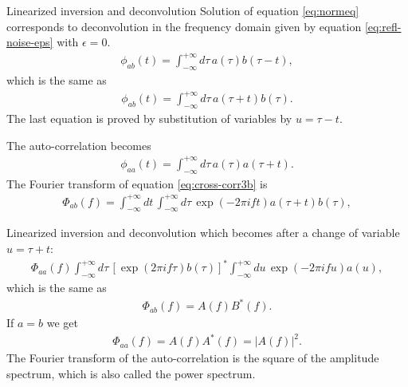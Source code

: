 \documentclass[xcolor=dvipsnames,notes]{beamer}
\begin{document}
\begin{frame}{Linearized inversion and deconvolution}
Solution of equation \eqref{eq:normeq} corresponds to
deconvolution in the frequency domain given by equation \eqref{eq:refl-noise-eps}
with $\epsilon=0$.
%
\begin{eqnarray}
  \phi_{a b}(t) =\int^{+\infty}_{-\infty} d\tau\, a(\tau)b(\tau-t),
             \label{eq:cross-corr3}
\end{eqnarray}
%
which is the same as
%
\begin{eqnarray}
  \phi_{a b}(t) =\int^{+\infty}_{-\infty} d\tau\, a(\tau+t)b(\tau).
             \label{eq:cross-corr3b}
\end{eqnarray}
%
The last equation is proved by substitution of variables by $u=\tau-t$.

The auto-correlation becomes
%
\begin{eqnarray}
  \phi_{a a}(t) =\int^{+\infty}_{-\infty}d\tau\, a(\tau)a(\tau+t).
             \label{eq:auto-corr3c}
\end{eqnarray}
%
The Fourier transform of equation \eqref{eq:cross-corr3b} is
%
\begin{eqnarray}
  \Phi_{ab}(f)=\int^{+\infty}_{-\infty}dt\, \int^{+\infty}_{-\infty}d\tau\, 
        \exp(-2\pi i f t)a(\tau+t)b(\tau),
\end{eqnarray}
%
\end{frame}
%
\begin{frame}{Linearized inversion and deconvolution}
which becomes after a change of variable $u=\tau+t$:
%
\begin{eqnarray}
  \Phi_{aa}(f)\int^{+\infty}_{-\infty}d\tau\, \left[\exp(2\pi i f \tau)b(\tau)\right]^*
   \int^{+\infty}_{-\infty}du\, \exp(-2\pi i f u) a(u),
\end{eqnarray}
%
which is the same as
%
\begin{eqnarray}
 \Phi_{ab}(f)=A(f)B^*(f). 
             \label{eq:cross-spectr}
\end{eqnarray}
%
If  $a=b$ we get 
%
\begin{eqnarray}
 \Phi_{aa}(f)=A(f)A^*(f) =|A(f)|^2.
             \label{eq:auto-spectr}
\end{eqnarray}
%
The Fourier transform of the auto-correlation is the square of the amplitude spectrum, which
is also called the power spectrum.
\end{frame}
\end{document}
